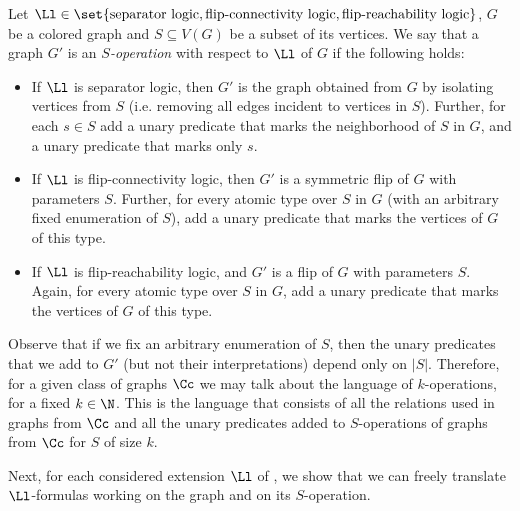 \begin{definition}
    Let $\Ll \in \set{\text{separator logic}, \text{flip-connectivity logic}, \text{flip-reachability logic}}$, $G$ be a colored graph and $S \subseteq V(G)$ be a subset of its vertices.
    We say that a graph $G'$ is an \emph{$S$-operation} with respect to $\Ll$ of $G$ if the following holds:
    \begin{itemize}[nosep]
        \item If $\Ll$ is separator logic, then $G'$ is the graph obtained from $G$ by isolating vertices from $S$ (i.e. removing all edges incident to vertices in $S$). Further, for each $s\in S$ add a unary predicate that marks the neighborhood of $S$ in $G$, and a unary predicate that marks only $s$.
        \item If $\Ll$ is flip-connectivity logic, then $G'$ is a symmetric flip of $G$ with parameters $S$. Further, for every atomic type over $S$ in $G$ (with an arbitrary fixed enumeration of $S$), add a unary predicate that marks the vertices of $G$ of this type.
        \item If $\Ll$ is flip-reachability logic, and $G'$ is a flip of $G$ with parameters $S$. Again, for every atomic type over $S$ in $G$, add a unary predicate that marks the vertices of $G$ of this type.
    \end{itemize}
\end{definition}

Observe that if we fix an arbitrary enumeration of $S$, then the unary predicates that we add to $G'$ (but not their interpretations) depend only on $|S|$.
Therefore, for a given class of graphs $\Cc$ we may talk about the language of $k$-operations, for a fixed $k \in \N$.
This is the language that consists of all the relations used in graphs from $\Cc$ and all the unary predicates added to $S$-operations of graphs from $\Cc$ for $S$ of size $k$.

Next, for each considered extension $\Ll$ of \fo, we  show that we can freely translate $\Ll$-formulas working on the graph and on its $S$-operation.

